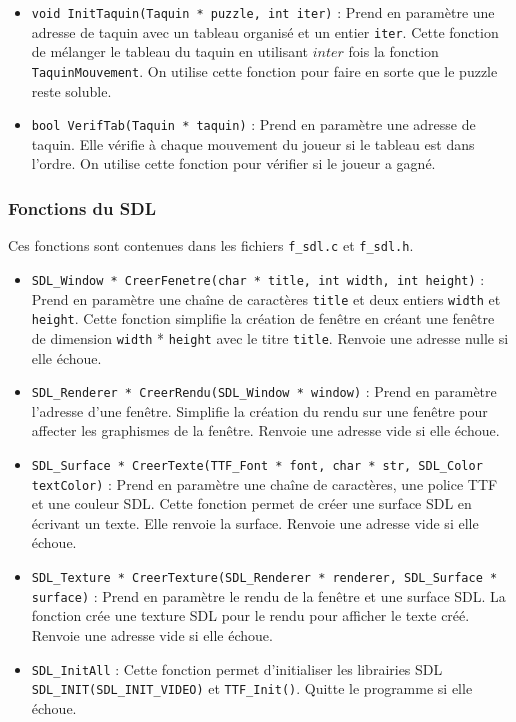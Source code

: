 \documentclass[11pt]{article}
\begin{document}
\begin{itemize}
\item \texttt{void InitTaquin(Taquin * puzzle, int iter)} : Prend en paramètre une adresse de taquin avec un tableau organisé et un entier \texttt{iter}. Cette fonction de mélanger le tableau du taquin en utilisant \(inter\) fois la fonction \texttt{TaquinMouvement}. On utilise cette fonction pour faire en sorte que le puzzle reste soluble.
\item \texttt{bool VerifTab(Taquin * taquin)} : Prend en paramètre une adresse de taquin. Elle vérifie à chaque mouvement du joueur si le tableau est dans l'ordre. On utilise cette fonction pour vérifier si le joueur a gagné.
\end{itemize}

\subsubsection{Fonctions du SDL}
\label{sec:org0149f8e}

Ces fonctions sont contenues dans les fichiers \texttt{f\_sdl.c} et \texttt{f\_sdl.h}.

\begin{itemize}
\item \texttt{SDL\_Window * CreerFenetre(char * title, int width, int height)} : Prend en paramètre une chaîne de caractères \texttt{title} et deux entiers \texttt{width} et \texttt{height}. Cette fonction simplifie la création de fenêtre en créant une fenêtre de dimension \texttt{width} * \texttt{height} avec le titre \texttt{title}. Renvoie une adresse nulle si elle échoue.
\item \texttt{SDL\_Renderer * CreerRendu(SDL\_Window * window)} : Prend en paramètre l'adresse d'une fenêtre. Simplifie la création du rendu sur une fenêtre pour affecter les graphismes de la fenêtre. Renvoie une adresse vide si elle échoue.
\item \texttt{SDL\_Surface * CreerTexte(TTF\_Font * font, char * str, SDL\_Color textColor)} : Prend en paramètre une chaîne de caractères, une police TTF et une couleur SDL. Cette fonction permet de créer une surface SDL en écrivant un texte. Elle renvoie la surface. Renvoie une adresse vide si elle échoue.
\item \texttt{SDL\_Texture * CreerTexture(SDL\_Renderer * renderer, SDL\_Surface * surface)} : Prend en paramètre le rendu de la fenêtre et une surface SDL. La fonction crée une texture SDL pour le rendu pour afficher le texte créé. Renvoie une adresse vide si elle échoue.
\item \texttt{SDL\_InitAll} : Cette fonction permet d'initialiser les librairies SDL \texttt{SDL\_INIT(SDL\_INIT\_VIDEO)} et \texttt{TTF\_Init()}. Quitte le programme si elle échoue.
\end{itemize}
\end{document}
